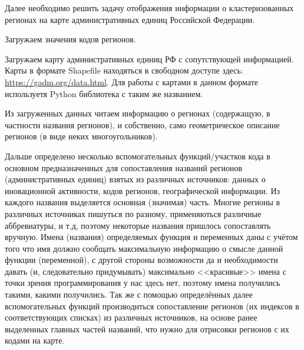 \documentclass[11pt]{article}
\begin{document}
    Далее необходимо решить задачу отображения информации о кластеризованных
регионах на карте административных единиц Российской Федерации.

    Загружаем значения кодов регионов.

    Загружаем карту административных единиц РФ с сопутствующей информацией.
Карты в формате Shapefile находяться в свободном доступе здесь:
\url{https://gadm.org/data.html}. Для работы с картами в данном формате
используетя Python библиотека с таким же названием.

    Из загруженных данных читаем информацию о регионах (содержащую, в
частности названия регионов), и собственно, само геометрическое описание
регионов (в виде неких многоугольников).

    Дальше определено несколько вспомогательных функций/участков кода в
основном предназначенных для сопоставления названий регионов
(административных единиц) взятых из различных источников: данных о
иновационной активности, кодов регионов, географической информации. Из
каждого названия выделяется основная (значимая) часть. Многие регионы в
различных источниках пишуться по разному, применяються различные
аббревиатуры, и т.д, поэтому некоторые названия пришлось сопоставлять
вручную. Имена (названия) определяемых функция и переменных даны с
учётом того что имя должно сообщать максимальную информацию о смысле
данной функции (переменной), с другой стороны возможности да и
необходимости давать (и, следовательно придумывать) максимально
<<красивые>> имена с точки зрения программирования у нас здесь нет,
поэтому имена получились такими, какими получились. Так же с помощью
определённых далее вспомогательных функций производиться сопоставление
регионов (их индексов в соответствующих списках) из различных
источников, на основе ранее выделенных главных частей названий, что
нужно для отрисовки регионов с их кодами на карте.
\end{document}
